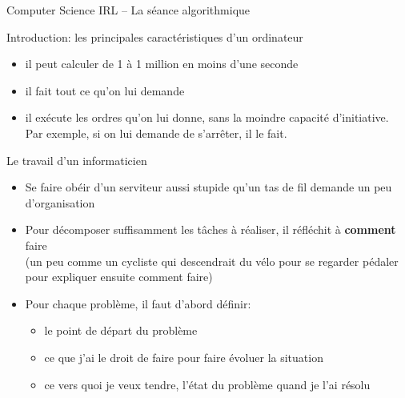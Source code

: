 \documentclass[final,hyperref={pdfpagelabels=false}]{beamer}
\renewcommand*{\small}{\fontsize{\resultsmallX}{\resultsmallY}\selectfont}
\begin{document}
\begin{frame}{Computer Science IRL -- La séance algorithmique}
  \begin{block}{Introduction: les principales caractéristiques d'un ordinateur}
    \begin{itemize}
    \item {} il peut calculer de 1 à 1
      million en moins d'une seconde
    \item {} il fait tout ce qu'on lui demande
    \item {} il exécute les
      ordres qu'on lui donne, sans la moindre capacité d'initiative.\\
      Par exemple, si on lui demande de s'arrêter, il le fait.
    \end{itemize}
  \end{block}\vspace{-.5\baselineskip}

  \begin{block}{Le travail d'un informaticien}
    \begin{itemize}
    \item Se faire obéir d'un serviteur aussi stupide qu'un tas de fil demande
      un peu d'organisation
    \item Pour décomposer suffisamment les tâches à réaliser, il réfléchit à
      \textbf{comment} faire\\
      {\small (un peu comme un cycliste qui descendrait du vélo pour se regarder
        pédaler pour expliquer ensuite comment faire)}
    \item Pour chaque problème, il faut d'abord définir:
      \begin{itemize}
      \item {} le point de départ du problème
      \item {} ce que j'ai le droit de faire pour faire
        évoluer la situation
      \item {} ce vers quoi je veux tendre, l'état
        du problème quand je l'ai résolu
      \end{itemize}
    \end{itemize}
  \end{block}
\end{frame}
\end{document}
